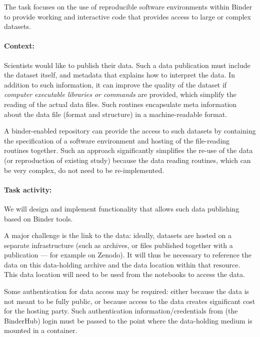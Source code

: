 \begin{task}[
  title=Data publishing,
  id=data-publishing,
  lead=MP,
  PM=8,
  partners={IFR,UIO}
  ]
  The task focuses on the use of reproducible software environments within
  Binder to provide working and interactive code that provides access to large
  or complex datasets.

  \paragraph*{Context:} Scientists would like to publish their data. Such a data
  publication must include the dataset itself, and metadata that explains how to
  interpret the data. In addition to such information, it can improve the
  quality of the dataset if \emph{computer executable libraries or commands}
  are provided, which simplify the reading of the actual data files. Such
  routines encapsulate meta information about the data file (format and
  structure) in a machine-readable format.

  A binder-enabled repository can provide the access to such datasets by
  containing the specification of a software environment and hosting of the
  file-reading routines together. Such an approach significantly simplifies the
  re-use of the data (or reproduction of existing study) because the data
  reading routines, which can be very complex, do not need to be re-implemented.

  \paragraph*{Task activity:}
  We will design and implement functionality that allows such data publishing
  based on Binder tools.

  A major challenge is the link to the data: ideally, datasets are hosted on a
  separate infrastructure (such as archives, or files published together with a
  publication --- for example on Zenodo). It will thus be necessary to reference
  the data on this data-holding archive and the data location within that resource.
  This data location will need to be used from the notebooks to access
  the data. %

  Some authentication for data access may be required: either because the data
  is not meant to be fully public, or because access to the data creates
  significant cost for the hosting party. Such authentication
  information/credentials from (the BinderHub) login must be passed to the point
  where the data-holding medium is mounted in a container.


\end{task}
